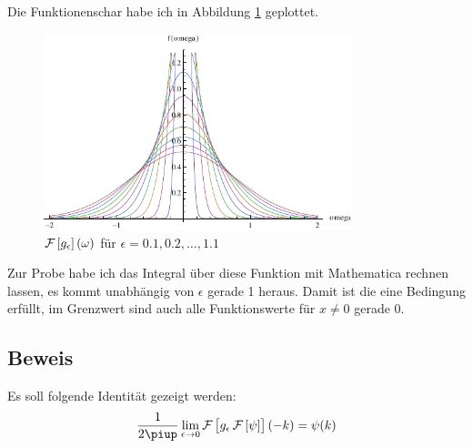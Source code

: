 Die Funktionenschar habe ich in Abbildung \ref{fig:Fourier} geplottet.

\begin{figure}
	\centering
	\includegraphics[width=0.8\textwidth]{Fouriertransformierte.pdf}
	\caption{$\fourier\sbr{g_\epsilon}(\omega)$ für $\epsilon = \num{0.1}, \num{0.2}, \ldots, \num{1.1}$}
	\label{fig:Fourier}
\end{figure}

Zur Probe habe ich das Integral über diese Funktion mit Mathematica rechnen
lassen, es kommt unabhängig von $\epsilon$ gerade 1 heraus. Damit ist die eine
Bedingung erfüllt, im Grenzwert sind auch alle Funktionswerte für $x \neq 0$
gerade 0.

\subsection{Beweis}

Es soll folgende Identität gezeigt werden:
\[
	\frac1{2\piup} \lim_{\epsilon\to0} \fourier\sbr{g_\epsilon \fourier\sbr\psi}(-k)
	= \psi(k)
\]


